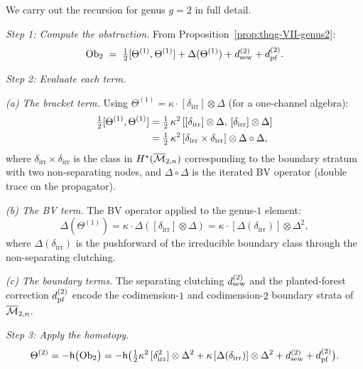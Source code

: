 \begin{computation}
\label{comp:thqg-VII-genus2}
We carry out the recursion for genus $g = 2$ in full detail.

\medskip\noindent\emph{Step 1: Compute the obstruction.}
From Proposition~\ref{prop:thqg-VII-genus2}:
\begin{equation}\label{eq:thqg-VII-obs2-full}
\mathrm{Ob}_2
\;=\;
\tfrac{1}{2}[\Theta^{(1)},\Theta^{(1)}]
+ \Delta(\Theta^{(1)})
+ d_{\mathrm{sew}}^{(2)} + d_{\mathrm{pf}}^{(2)}.
\end{equation}

\medskip\noindent\emph{Step 2: Evaluate each term.}

\emph{(a) The bracket term.} Using
$\Theta^{(1)} = \kappa \cdot [\delta_{\mathrm{irr}}]
\otimes \Delta$ (for a one-channel algebra):
\begin{align}
\tfrac{1}{2}[\Theta^{(1)},\Theta^{(1)}]
&= \tfrac{1}{2}\,\kappa^2\,
 [[\delta_{\mathrm{irr}}] \otimes \Delta,\,
 [\delta_{\mathrm{irr}}] \otimes \Delta]
\notag\\
&= \tfrac{1}{2}\,\kappa^2\,
 [\delta_{\mathrm{irr}} \times \delta_{\mathrm{irr}}]
 \otimes \Delta \circ \Delta,
\label{eq:thqg-VII-bracket-term-g2}
\end{align}
where $\delta_{\mathrm{irr}} \times \delta_{\mathrm{irr}}$
is the class in $H^*(\overline{\mathcal{M}}_{2,n})$ corresponding to the
boundary stratum with two non-separating nodes, and
$\Delta \circ \Delta$ is the iterated BV operator (double
trace on the propagator).

\emph{(b) The BV term.} The BV operator applied to the genus-$1$
element:
\begin{equation}\label{eq:thqg-VII-bv-term-g2}
\Delta(\Theta^{(1)})
= \kappa \cdot \Delta([\delta_{\mathrm{irr}}] \otimes \Delta)
= \kappa \cdot [\Delta(\delta_{\mathrm{irr}})]
 \otimes \Delta^2,
\end{equation}
where $\Delta(\delta_{\mathrm{irr}})$ is the pushforward of
the irreducible boundary class through the non-separating
clutching.

\emph{(c) The boundary terms.} The separating clutching
$d_{\mathrm{sew}}^{(2)}$ and the planted-forest correction $d_{\mathrm{pf}}^{(2)}$
encode the codimension-$1$ and codimension-$2$ boundary strata
of $\overline{\mathcal{M}}_{2,n}$.

\medskip\noindent\emph{Step 3: Apply the homotopy.}
\begin{equation}\label{eq:thqg-VII-theta2-solution}
\Theta^{(2)}
= -\mathsf{h}\bigl(\mathrm{Ob}_2\bigr)
= -\mathsf{h}\bigl(
 \tfrac{1}{2}\kappa^2\,
 [\delta_{\mathrm{irr}}^2] \otimes \Delta^2
 + \kappa\,[\Delta(\delta_{\mathrm{irr}})]
 \otimes \Delta^2
 + d_{\mathrm{sew}}^{(2)} + d_{\mathrm{pf}}^{(2)}
 \bigr).
\end{equation}


\end{computation}
